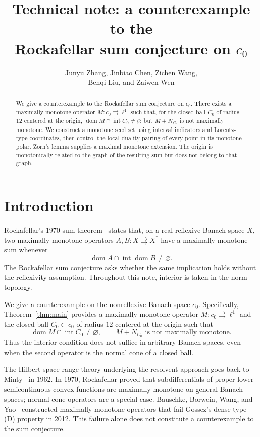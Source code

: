 \documentclass[11pt,a4paper]{article}
\theoremstyle{reportstyle}
\numberwithin{equation}{section}
\DeclareMathOperator{\dom}{dom}
\DeclareMathOperator{\Int}{int}
\begin{document}
	\title{Technical note: a counterexample to the\\ Rockafellar sum conjecture on $c_0$}
	\author{Junyu Zhang, Jinbiao Chen, Zichen Wang,\\ Benqi Liu, and Zaiwen Wen}
	\date{}

	\maketitle

	\begin{abstract}
		We give a counterexample to the Rockafellar sum conjecture on $c_0$.
		There exists a maximally monotone operator $M:c_0\rightrightarrows\ell^1$
		such that, for the closed ball $C_0$ of radius $12$ centered at the origin,
		$\dom M\cap\Int C_0\ne\varnothing$ but $M+N_{C_0}$ is not maximally monotone.
		We construct a monotone seed set using interval indicators and Lorentz-type
		coordinates, then control the local duality pairing of every point in its
		monotone polar. Zorn's lemma supplies a maximal monotone extension.
		The origin is monotonically related to the graph of the resulting sum
		but does not belong to that graph.
	\end{abstract}

	\section{Introduction}
	Rockafellar's 1970 sum theorem~\cite{rockafellar1970maximality} states that, on a
	real reflexive Banach space $X$, two maximally monotone operators
	$A,B:X\rightrightarrows X^*$ have a maximally monotone sum whenever
	$$ \dom A\cap\Int\dom B\ne\varnothing. $$
	The Rockafellar sum conjecture asks whether the same implication holds
	without the reflexivity assumption. Throughout this note, interior is
	taken in the norm topology.

	We give a counterexample on the nonreflexive Banach space $c_0$.
	Specifically, Theorem~\ref{thm:main} provides a maximally monotone operator
	$M:c_0\rightrightarrows\ell^1$ and the closed ball $C_0\subset c_0$
	of radius $12$ centered at the origin such that
	$$ \dom M\cap\Int C_0\ne\varnothing,
	\qquad M+N_{C_0}\text{ is not maximally monotone}. $$
	Thus the interior condition does not suffice in arbitrary Banach spaces,
	even when the second operator is the normal cone of a closed ball.

	The Hilbert-space range theory underlying the resolvent approach goes
	back to Minty~\cite{minty1962monotone} in 1962. In 1970, Rockafellar
	\cite{rockafellar1970subdifferential} proved that subdifferentials of
	proper lower semicontinuous convex functions are maximally monotone on
	general Banach spaces; normal-cone operators are a special case.
	Bauschke, Borwein, Wang, and Yao~\cite{bauschke2012construction} constructed
	maximally monotone operators that fail Gossez's dense-type (D) property
	in 2012. This failure alone does not constitute a counterexample to the
	sum conjecture.
\end{document}
